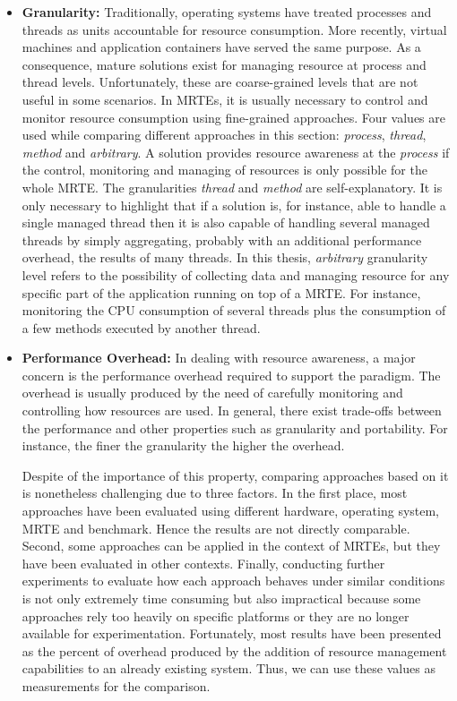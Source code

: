 \begin{itemize}
\item \textbf{Granularity:}
Traditionally, operating systems have treated processes and threads as units accountable for resource consumption.
More recently, virtual machines and application containers have served the same purpose.
As a consequence, mature solutions exist for managing resource at process and thread levels.
Unfortunately, these are coarse-grained levels that are not useful in some scenarios.
In MRTEs, it is usually necessary to control and monitor resource consumption using fine-grained approaches.
Four values are used while comparing different approaches in this section: \textit{process}, \textit{thread}, \textit{method} and \textit{arbitrary}.
A solution provides resource awareness at the \textit{process} if the control, monitoring and managing of resources is only possible for the whole MRTE.
The granularities \textit{thread} and \textit{method} are self-explanatory.
It is only necessary to highlight that if a solution is, for instance, able to handle a single managed thread then it is also capable of handling several managed threads by simply aggregating, probably with an additional performance overhead, the results of many threads.
In this thesis, \textit{arbitrary} granularity level refers to the possibility of collecting data and managing resource for any specific part of the application running on top of a MRTE.
For instance, monitoring the CPU consumption of several threads plus the consumption of a few methods executed by another thread.


\item \textbf{Performance Overhead:} 
In dealing with resource awareness, a major concern is the performance overhead required to support the paradigm.
The overhead is usually produced by the need of carefully monitoring and controlling how resources are used.
In general, there exist trade-offs between the performance and other properties such as granularity and portability.
For instance, the finer the granularity the higher the overhead.

Despite of the importance of this property, comparing approaches based on it is nonetheless challenging due to three factors.
In the first place, most approaches have been evaluated using different hardware, operating system, MRTE and benchmark.
Hence the results are not directly comparable.  
Second, some approaches can be applied in the context of MRTEs, but they have been evaluated in other contexts.
Finally, conducting further experiments to evaluate how each approach behaves under similar conditions is not only extremely time consuming but also impractical because some approaches rely too heavily on specific platforms or they are no longer available for experimentation.
Fortunately, most results have been presented as the percent of overhead produced by the addition of resource management capabilities to an already existing system.
Thus, we can use these values as measurements for the comparison.


\end{itemize}
